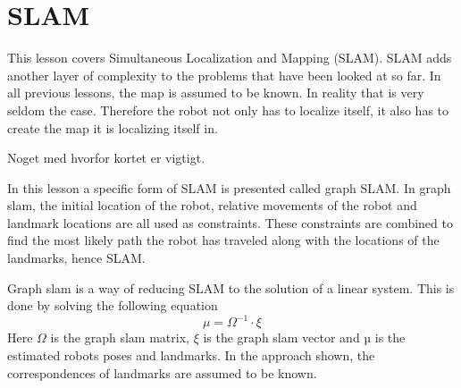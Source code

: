 \documentclass[Main]{subfiles}
\begin{document}
\section{SLAM} %
	\label{sec:slam}
This lesson covers Simultaneous Localization and Mapping (SLAM). 
SLAM adds another layer of complexity to the problems that have been looked at so far. 
In all previous lessons, the map is assumed to be known. 
In reality that is very seldom the case. 
Therefore the robot not only has to localize itself, it also has to create the map it is localizing itself in.

Noget med hvorfor kortet er vigtigt.

In this lesson a specific form of SLAM is presented called graph SLAM. 
In graph slam, the initial location of the robot, relative movements of the robot and landmark locations are all used as constraints. 
These constraints are combined to find the most likely path the robot has traveled along with the locations of the landmarks, hence SLAM.

Graph slam is a way of reducing SLAM to the solution of a linear system. 
This is done by solving the following equation
\begin{equation}
	\mu = \Omega^{-1} \cdot \xi
\end{equation}
Here $\Omega$ is the graph slam matrix, $\xi$ is the graph slam vector and µ is the estimated robots poses and landmarks. In the approach shown, the correspondences of landmarks are assumed to be known.

\end{document}
